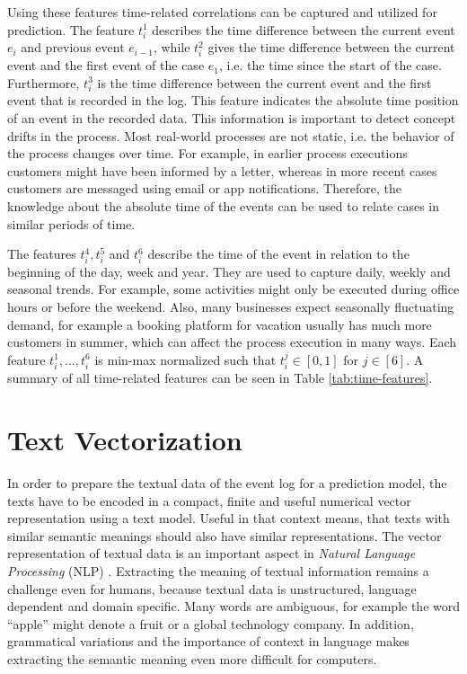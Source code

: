 Using these features time-related correlations can be captured and utilized for prediction.
The feature $t_i^1$ describes the time difference between the current event $e_i$ and previous event $e_{i-1}$, while $t_i^2$ gives the time difference between the current event and the first event of the case $e_1$, i.e. the time since the start of the case.
Furthermore, $t_i^3$ is the time difference between the current event and the first event that is recorded in the log. This feature indicates the absolute time position of an event in the recorded data.
This information is important to detect concept drifts \cite{DBLP:journals/tnn/BoseAZP14} in the process.
Most real-world processes are not static, i.e. the behavior of the process changes over time.
For example, in earlier process executions customers might have been informed by a letter, whereas in more recent cases customers are messaged using email or app notifications.
Therefore, the knowledge about the absolute time of the events can be used to relate cases in similar periods of time.

The features $t_i^4, t_i^5$ and $t_i^6$ describe the time of the event in relation to the beginning of the day, week and year.
They are used to capture daily, weekly and seasonal trends.
For example, some activities might only be executed during office hours or before the weekend.
Also, many businesses expect seasonally fluctuating demand, for example a booking platform for vacation usually has much more customers in summer, which can affect the process execution in many ways.
Each feature $t_i^1, \dots, t_i^6$ is min-max normalized such that $t_i^j \in [0,1]$ for $j \in [6]$.
A summary of all time-related features can be seen in Table \ref{tab:time-features}.

\section{Text Vectorization}\label{sec:text}

In order to prepare the textual data of the event log for a prediction model, the texts have to be encoded in a compact, finite and useful numerical vector representation using a text model.
Useful in that context means, that texts with similar semantic meanings should also have similar representations.
The vector representation of textual data is an important aspect in \textit{Natural Language Processing} (NLP) \cite{DBLP:books/daglib/0001548}.
Extracting the meaning of textual information remains a challenge even for humans, because textual data is unstructured, language dependent and domain specific.
Many words are ambiguous, for example the word \enquote{apple} might denote a fruit or a global technology company.
In addition, grammatical variations and the importance of context in language makes extracting the semantic meaning even more difficult for computers.

